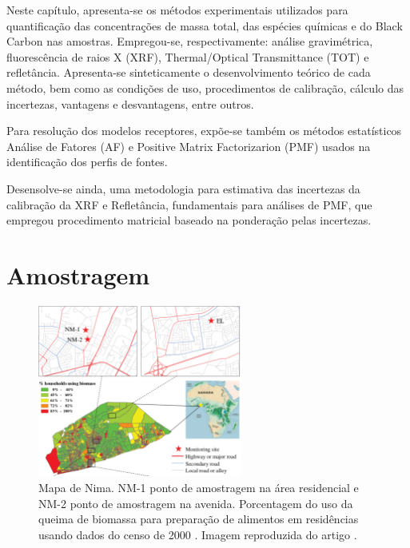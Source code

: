 Neste capítulo, apresenta-se os métodos experimentais utilizados para 
quantificação das concentrações de massa total, das espécies químicas e 
do Black Carbon nas amostras. Empregou-se, respectivamente:
análise gravimétrica, fluorescência de raios X (XRF),
Thermal/Optical Transmittance (TOT) e refletância.
Apresenta-se sinteticamente o desenvolvimento teórico de cada método, bem como 
as condições de uso, procedimentos de calibração, cálculo das incertezas, 
vantagens e desvantagens, entre outros.

Para resolução dos modelos receptores, expõe-se também os métodos 
estatísticos Análise de Fatores (AF) e Positive Matrix Factorizarion (PMF) 
usados na identificação dos perfis de fontes. 

Desensolve-se ainda, uma metodologia para estimativa das incertezas
da calibração da XRF e Refletância, fundamentais para análises de PMF,
que empregou procedimento matricial baseado na ponderação pelas incertezas.%

\newpage
\section{Amostragem}

\begin{figure}[H]
\begin{center}
  \includegraphics[width=0.6\textwidth]{../inputs/images/zheng/nima_mapa.pdf}
  \caption{Mapa de Nima. NM-1 ponto de amostragem na área residencial e 
           NM-2 ponto de amostragem na avenida. Porcentagem do uso da queima
           de biomassa para preparação de alimentos em residências usando dados
           do censo de 2000 \citep{ghanacensus2003}. Imagem reproduzida do 
           artigo \citet{zhou2013}. \label{fig:nima_mapa}}
\end{center}
\end{figure}

